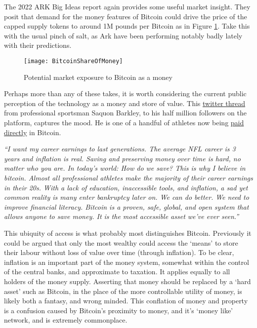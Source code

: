 The 2022 ARK Big Ideas report again provides some useful market insight. They posit that demand for the money features of Bitcoin could drive the price of the capped supply tokens to around 1M pounds per Bitcoin as in Figure \ref{fig:BitcoinShareOfMoney}. Take this with the usual pinch of salt, as Ark have been performing notably badly lately with their predictions.
\begin{figure}
  \centering
    \texttt{[image: BitcoinShareOfMoney]}
  \caption{Potential market exposure to Bitcoin as a money}
  \label{fig:BitcoinShareOfMoney}
\end{figure}
Perhaps more than any of these takes, it is worth considering the current public perception of the technology as a money and store of value. This \href{https://twitter.com/saquon/status/1480738426236375041}{twitter thread} from professional sportsman Saquon Barkley, to his half million followers on the platform, captures the mood. He is one of a handful of athletes now being \href{https://www.buybitcoinworldwide.com/athletes/}{paid directly} in Bitcoin.\par
\textit{``I want my career earnings to last generations. The average NFL career is 3 years and inflation is real. Saving and preserving money over time is hard, no matter who you are.
In today’s world: How do we save? This is why I believe in bitcoin. Almost all professional athletes make the majority of their career earnings in their 20s. With a lack of education, inaccessible tools, and inflation, a sad yet common reality is many enter bankruptcy later on. We can do better. We need to improve financial literacy. Bitcoin is a proven, safe, global, and open system that allows anyone to save money. It is the most accessible asset we’ve ever seen.''}\par
This ubiquity of access is what probably most distinguishes Bitcoin. Previously it could be argued that only the most wealthy could access the `means' to store their labour without loss of value over time (through inflation). To be clear, inflation is an important part of the money system, somewhat within the control of the central banks, and approximate to taxation. It applies equally to all holders of the money supply. Asserting that money should be replaced by a `hard asset' such as Bitcoin, in the place of the more controllable utility of money, is likely both a fantasy, and wrong minded. This conflation of money and property is a confusion caused by Bitcoin's proximity to money, and it's `money like' network, and is extremely commonplace.\par
